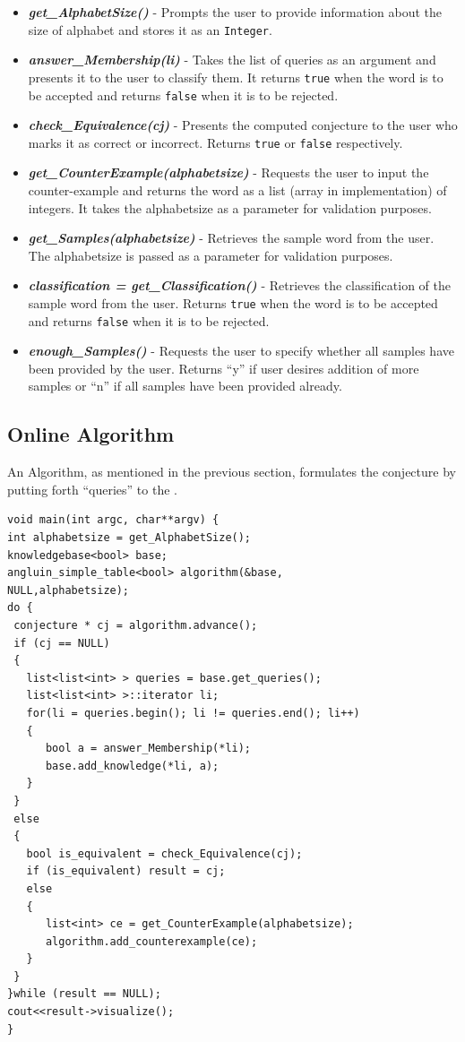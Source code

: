 \begin{itemize}
\item \textbf{\emph{get\_AlphabetSize()}} - Prompts the user to provide information about the size of alphabet and stores it as an \texttt{Integer}.
\item \textbf{\emph{answer\_Membership(\*li)}} - Takes the list of queries as an argument and presents it to the user to classify them. It returns \texttt{true} when the word is to be accepted and returns \texttt{false} when it is to be rejected.
\item \textbf{\emph{check\_Equivalence(cj)}} - Presents the computed conjecture to the user who marks it as correct or incorrect. Returns \texttt{true} or \texttt{false} respectively.
\item \textbf{\emph{get\_CounterExample(alphabetsize)}} - Requests the user to input the counter-example and returns the word as a list (array in \java implementation) of integers. It takes the alphabetsize as a parameter for validation purposes.
\item \textbf{\emph{get\_Samples(alphabetsize)}} - Retrieves the sample word from the user. The alphabetsize is passed as a parameter for validation purposes.
\item \textbf{\emph{classification = get\_Classification()}} - Retrieves the classification of the sample word from the user. Returns \texttt{true} when the word is to be accepted and returns \texttt{false} when it is to be rejected.
\item \textbf{\emph{enough\_Samples()}} - Requests the user to specify whether all samples have been provided by the user. Returns ``y'' if user desires addition of more samples or ``n'' if all samples have been provided already.
\end{itemize}

\subsection{Online Algorithm}

An \online Algorithm, as mentioned in the previous section, formulates the conjecture by putting forth ``queries'' to the \teacher.

\lstset{language=c++, numbers=left, numberstyle=\tiny, stepnumber=1, numbersep=5pt}
\begin{lstlisting}[frame=single]
void main(int argc, char**argv) {
int alphabetsize = get_AlphabetSize();
knowledgebase<bool> base;
angluin_simple_table<bool> algorithm(&base,
NULL,alphabetsize);
do {
 conjecture * cj = algorithm.advance();
 if (cj == NULL) 
 {
   list<list<int> > queries = base.get_queries();
   list<list<int> >::iterator li;
   for(li = queries.begin(); li != queries.end(); li++) 
   {
      bool a = answer_Membership(*li);
      base.add_knowledge(*li, a);
   }
 }
 else 
 {
   bool is_equivalent = check_Equivalence(cj);
   if (is_equivalent) result = cj; 
   else 
   {	
      list<int> ce = get_CounterExample(alphabetsize);
      algorithm.add_counterexample(ce);
   }
 }
}while (result == NULL);
cout<<result->visualize();
}
\end{lstlisting}

